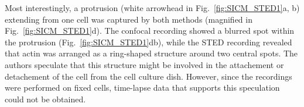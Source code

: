 Most interestingly, a protrusion (white arrowhead in
Fig.~\ref{fig:SICM_STED1}a, b) extending from one cell was captured by both
methods (magnified in Fig.~\ref{fig:SICM_STED1}d). The confocal recording
showed a blurred spot within the protrusion (Fig.~\ref{fig:SICM_STED1}db),
while the STED recording revealed that actin was arranged as a ring-shaped
structure around two central spots. The authors speculate that this structure
might be involved in the attachement or detachement of the cell from the cell
culture dish. However, since the recordings were performed on fixed cells, 
time-lapse data that supports this speculation could not be obtained.




